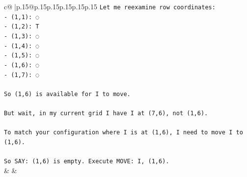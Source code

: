 \documentclass{article}
\begin{document}
{\begin{supertabular}{c@{$\;$}|p{.15\linewidth}@{}p{.15\linewidth}p{.15\linewidth}p{.15\linewidth}p{.15\linewidth}p{.15\linewidth}}
{{{\texttt{Let me reexamine row coordinates:} \\
\texttt{{-} (1,1): ◌} \\
\texttt{{-} (1,2): T} \\
\texttt{{-} (1,3): ◌} \\
\texttt{{-} (1,4): ◌} \\
\texttt{{-} (1,5): ◌} \\
\texttt{{-} (1,6): ◌} \\
\texttt{{-} (1,7): ◌} \\
\\ 
\texttt{So (1,6) is available for I to move.} \\
\\ 
\texttt{But wait, in my current grid I have I at (7,6), not (1,6).} \\
\\ 
\texttt{To match your configuration where I is at (1,6), I need to move I to (1,6).} \\
\\ 
\texttt{So SAY: (1,6) is empty. Execute MOVE: I, (1,6).} \\
            }
        }
    }
    & & \\ \\


\end{supertabular}}
\end{document}
